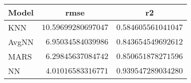 \begin{table}[!tbp]
\begin{center}
\begin{tabular}{lrr}
\hline\hline
\multicolumn{1}{l}{Model}&\multicolumn{1}{c}{rmse}&\multicolumn{1}{c}{r2}\tabularnewline
\hline
KNN&$10.59699280697047$&$0.584605561041047$\tabularnewline
AvgNN&$ 6.95034584039986$&$0.843654549692612$\tabularnewline
MARS&$ 6.29845637084742$&$0.850651878271596$\tabularnewline
NN&$ 4.01016583316771$&$0.939547289034280$\tabularnewline
\hline
\end{tabular}\end{center}

\end{table}
